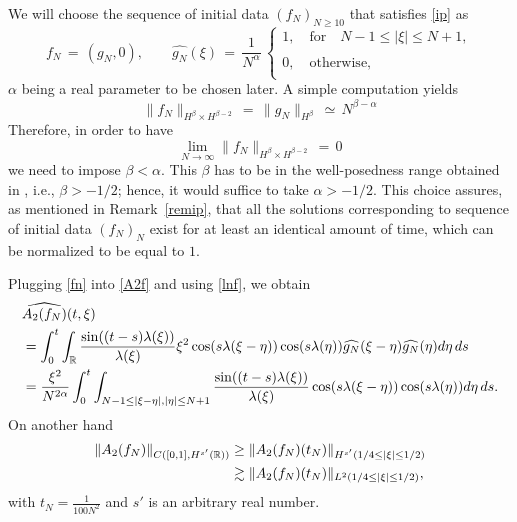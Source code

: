 \documentclass{amsart}
\begin{document}
We will choose the sequence of initial data $(f_N)_{N\geq 10}$ that satisfies \eqref{ip} as
\begin{equation}
f_N\,=\,(g_N, 0), \qquad \widehat{g_N}(\xi)\,=\,\frac{1}{N^\alpha}\,\left\{
\begin{array}{l}
1,\quad \text{for} \quad N-1\leq |\xi| \leq N+1,\\
\\
0,\quad \text{otherwise},\\
\end{array}\right.
\label{fn}
\end{equation}
$\alpha$ being a real parameter to be chosen later. A simple computation yields
\begin{equation}
\|f_N\|_{H^\beta\times H^{\beta-2}}\,=\,\|g_N\|_{H^\beta}\,\simeq\,N^{\beta-\alpha}
\label{hsfn}
\end{equation}
Therefore, in order to have 
\[
\lim_{N\to \infty} \|f_N\|_{H^\beta \times H^{\beta -2}}\,=\,0
\]
we need to impose $\beta<\alpha$. This $\beta$ has to be in the well-posedness range obtained in \cite{Kishimoto:2010ly}, i.e., $\beta>-1/2$; hence, it would suffice to take $\alpha >-1/2$. This choice assures, as mentioned in Remark~\ref{remip}, that all the solutions corresponding to sequence of initial data $(f_N)_N$ exist for at least an identical amount of time, which can be normalized to be equal to $1$. 

Plugging \eqref{fn} into \eqref{A2f} and using \eqref{lnf}, we obtain
\begin{equation}
\aligned
&\widehat{A_2(f_N)}(t,\xi)\\
&=\int_0^t \int_{\mathbb{R}} \frac{\sin((t-s) \lambda(\xi))}{\lambda(\xi)} \xi^2 \cos(s \lambda(\xi-\eta))\cos(s\lambda(\eta))\widehat{g_N}(\xi-\eta)\widehat{g_N}(\eta)d\eta\,ds\\
&=\frac{\xi^2}{N^{2\alpha}}\int_0^t \int_{N-1\leq |\xi-\eta|, |\eta| \leq N+1}\frac{\sin((t-s) \lambda(\xi))}{\lambda(\xi)}\cos(s \lambda(\xi-\eta))\cos(s\lambda(\eta))d\eta\,ds.\endaligned
\label{A2fn}
\end{equation}
On another hand
\begin{equation}
\aligned
\|A_2(f_N)\|_{C([0,1], H^{s'}(\mathbb{R}))} &\geq \|A_2(f_N)(t_N)\|_{H^{s'}(1/4\leq |\xi| \leq 1/2)}\\ &\gtrsim \|A_2(f_N)(t_N)\|_{L^2(1/4\leq |\xi| \leq 1/2)},\label{hsA2}
\endaligned
\end{equation}
with $t_N=\frac{1}{100 N^2}$ and $s'$ is an arbitrary real number.
\end{document}
